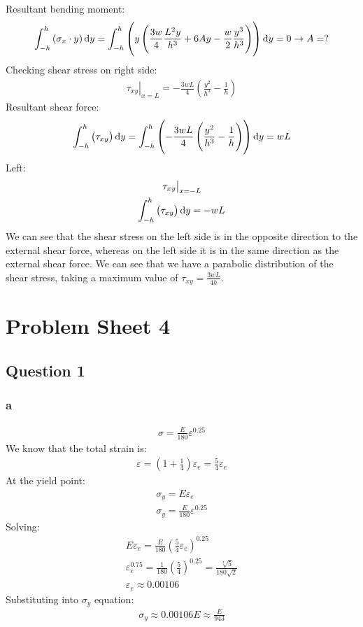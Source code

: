 \documentclass[11pt]{article}
\numberwithin{equation}{section}
\begin{document}
Resultant bending moment:
\begin{gather}
    \int_{-h}^h \left(\sigma_x \cdot y\right)\dif y = \int_{-h}^h \left(y\left(\frac{3w}{4}\frac{L^2y}{h^3} + 6Ay -\frac{w}{2}\frac{y^3}{h^3}\right)\right)\dif y = 0 \rightarrow A = ?
\end{gather}
Checking shear stress on right side:
\begin{gather}
    \left.\tau_{xy}\right|_{x=L} = -\frac{3wL}{4}\left(\frac{y^2}{h^3} - \frac{1}{h}\right)
\end{gather}
Resultant shear force:
\begin{gather}
    \int_{-h}^h \left(\tau_{xy}\right)\dif y = \int_{-h}^h \left(-\frac{3wL}{4}\left(\frac{y^2}{h^3}-\frac{1}{h}\right)\right)\dif y = wL
\end{gather}
Left:
\begin{gather}
    \left. \tau_{xy} \right|_{x = -L}\\
    \int_{-h}^h \left(\tau_{xy}\right)\dif y = - wL
\end{gather}
We can see that the shear stress on the left side is in the opposite direction to the external shear force, whereas on the left side it is in the same direction as the external shear force. We can see that we have a parabolic distribution of the shear stress, taking a maximum value of $\tau_{xy} = \frac{3wL}{4h}$.
\section{Problem Sheet 4}
\subsection{Question 1}
\subsubsection{a}
\begin{gather}
    \sigma = \frac{E}{180}\varepsilon^{0.25}
\end{gather}
We know that the total strain is:
\begin{gather}
    \varepsilon = \left(1 + \frac{1}{4}\right)\varepsilon_e = \frac{5}{4}\varepsilon_e
\end{gather}
At the yield point:
\begin{gather}
    \sigma_y = E\varepsilon_e \\ 
    \sigma_y = \frac{E}{180}\varepsilon^{0.25}
\end{gather}
Solving:
\begin{gather}
    E\varepsilon_e = \frac{E}{180}\left(\frac{5}{4}\varepsilon_e\right)^{0.25}\\
    \varepsilon_e^{0.75} = \frac{1}{180}\left(\frac{5}{4}\right)^{0.25} = \frac{\sqrt[4]{5}}{180\sqrt{2}}\\ 
    \varepsilon_e \approx 0.00106
\end{gather}
Substituting into $\sigma_y$ equation:
\begin{gather}
    \sigma_y \approx 0.00106 E \approx \frac{E}{943}
\end{gather}
\end{document}
